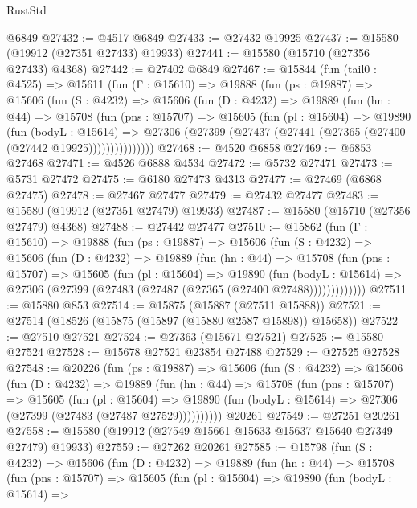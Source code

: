 \begin{lexlean}{RustStd}
\begin{coremodule}
    @6849
@27432 := @4517 @6849
@27433 := @27432 @19925
@27437 := @15580 (@19912 (@27351 @27433) @19933)
@27441 := @15580 (@15710 (@27356 @27433) @4368)
@27442 := @27402 @6849
@27467 := @15844
    (fun (tail0 : @4525) =>
    @15611
      (fun (Γ : @15610) =>
      @19888
        (fun (ps : @19887) =>
        @15606
          (fun (S : @4232) =>
          @15606
            (fun (D : @4232) =>
            @19889
              (fun (hn : @44) =>
              @15708
                (fun (pns : @15707) =>
                @15605
                  (fun (pl : @15604) =>
                  @19890
                    (fun (bodyL : @15614) =>
                    @27306 (@27399 (@27437 (@27441 (@27365 (@27400 (@27442 @19925)))))))))))))))
@27468 := @4520 @6858
@27469 := @6853 @27468
@27471 := @4526 @6888 @4534
@27472 := @5732 @27471
@27473 := @5731 @27472
@27475 := @6180 @27473 @4313
@27477 := @27469 (@6868 @27475)
@27478 := @27467 @27477
@27479 := @27432 @27477
@27483 := @15580 (@19912 (@27351 @27479) @19933)
@27487 := @15580 (@15710 (@27356 @27479) @4368)
@27488 := @27442 @27477
@27510 := @15862
    (fun (Γ : @15610) =>
    @19888
      (fun (ps : @19887) =>
      @15606
        (fun (S : @4232) =>
        @15606
          (fun (D : @4232) =>
          @19889
            (fun (hn : @44) =>
            @15708
              (fun (pns : @15707) =>
              @15605
                (fun (pl : @15604) =>
                @19890
                  (fun (bodyL : @15614) =>
                  @27306 (@27399 (@27483 (@27487 (@27365 (@27400 @27488)))))))))))))
@27511 := @15880 @853
@27514 := @15875 (@15887 (@27511 @15888))
@27521 := @27514 (@18526 (@15875 (@15897 (@15880 @2587 @15898)) @15658))
@27522 := @27510 @27521
@27524 := @27363 (@15671 @27521)
@27525 := @15580 @27524
@27528 := @15678 @27521 @23854 @27488
@27529 := @27525 @27528
@27548 := @20226
    (fun (ps : @19887) =>
    @15606
      (fun (S : @4232) =>
      @15606
        (fun (D : @4232) =>
        @19889
          (fun (hn : @44) =>
          @15708
            (fun (pns : @15707) =>
            @15605
              (fun (pl : @15604) =>
              @19890 (fun (bodyL : @15614) => @27306 (@27399 (@27483 (@27487 @27529))))))))))
    @20261
@27549 := @27251 @20261
@27558 := @15580 (@19912 (@27549 @15661 @15633 @15637 @15640 @27349 @27479) @19933)
@27559 := @27262 @20261
@27585 := @15798
    (fun (S : @4232) =>
    @15606
      (fun (D : @4232) =>
      @19889
        (fun (hn : @44) =>
        @15708
          (fun (pns : @15707) =>
          @15605
            (fun (pl : @15604) =>
            @19890
              (fun (bodyL : @15614) =>

\end{coremodule}
\end{lexlean}
